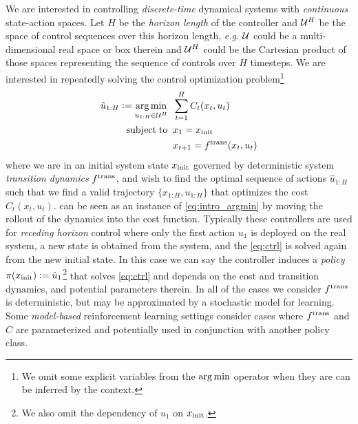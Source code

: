 \documentclass{article}
\newcommand{\eg}{{\it e.g.}\xspace}
\begin{document}
We are interested in controlling \emph{discrete-time} dynamical
systems with \emph{continuous} state-action spaces.
Let $H$ be the \emph{horizon length} of the controller
and ${\mathcal{U}}^H$ be the space of control sequences over this
horizon length, \eg
${\mathcal{U}}$ could be a multi-dimensional real space or box therein
and ${\mathcal{U}}^H$ could be the Cartesian product of those spaces
representing the sequence of controls over $H$ timesteps.
We are interested in repeatedly solving the control
optimization problem\footnote{%
  We omit some explicit
  variables from the $\operatorname*{arg\,min}$ operator when they are
  can be inferred by the context.}
\begin{equation}
  \begin{split}
    \hat u_{1:H} \vcentcolon= \operatorname*{arg\,min}_{u_{1:H}\in {\mathcal{U}}^H} &\;\; \sum_{t=1}^H  C_t(x_t, u_t) \\
    \operatorname*{subject\;to} &\;\; x_1 = x_{\rm init} \\
    &\;\; x_{t+1} = f^{\mathrm{trans}}(x_t, u_t)
  \end{split}
  \label{eq:ctrl}
\end{equation}
where we are in an initial system state $x_{\rm init}$
governed by deterministic system \emph{transition dynamics} $f^{\mathrm{trans}}$,
and wish to find the optimal sequence of actions $\hat u_{1:H}$
such that we find a valid trajectory $\{x_{1:H}, u_{1:H}\}$
that optimizes the cost $C_t(x_t, u_t)$.
 can be seen as an instance of
\cref{eq:intro_argmin} by moving the rollout of the
dynamics into the cost function.
Typically these controllers are used for \emph{receding horizon} control
\citep{mayne1990receding}
where only the first action $u_1$
is deployed on the real system, a new state is obtained from the system,
and the \cref{eq:ctrl} is solved again from the new initial state.
In this case we can say the controller induces a \emph{policy}
$\pi(x_{\rm init})\vcentcolon=\hat u_1$\footnote{%
  We also omit the dependency of $u_1$ on $x_{\rm init}$.}
that solves \cref{eq:ctrl}
and depends on the cost and transition dynamics, and potential
parameters therein.
In all of the cases we consider $f^{\mathrm{trans}}$ is deterministic, but
may be approximated by a stochastic model for learning.
Some \emph{model-based} reinforcement learning settings consider
cases where $f^{\mathrm{trans}}$ and $C$ are parameterized and potentially
used in conjunction with another policy class.
\end{document}
